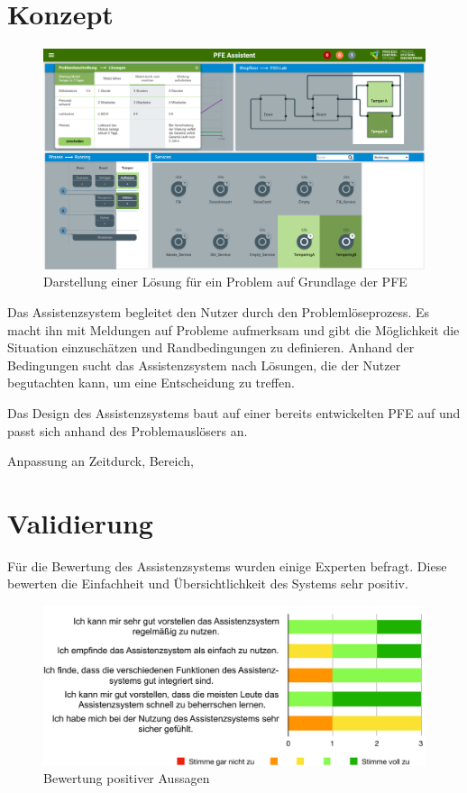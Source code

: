 \documentclass{ifaPoster}
\begin{document}
\section{Konzept}
\begin{figure}[htbp]
\centering
\includegraphics[scale=0.4]{DA_files/Prototyp-PFE-Loesung2.png}
\caption{Darstellung einer Lösung für ein Problem auf Grundlage der PFE}
\end{figure}
Das Assistenzsystem begleitet den Nutzer durch den Problemlöseprozess. Es macht ihn mit Meldungen auf Probleme aufmerksam und gibt die Möglichkeit die Situation einzuschätzen und Randbedingungen zu definieren. Anhand der Bedingungen sucht das Assistenzsystem nach Lösungen, die der Nutzer begutachten kann, um eine Entscheidung zu treffen.

Das Design des Assistenzsystems baut auf einer bereits entwickelten PFE auf \cite{} und passt sich anhand des Problemauslösers an.

Anpassung an Zeitdurck, Bereich, 

\section{Validierung}
Für die Bewertung des Assistenzsystems wurden einige Experten befragt. Diese bewerten die Einfachheit und Übersichtlichkeit des Systems sehr positiv. 

\begin{figure}[htb]
\centering
\includegraphics[scale=0.8]{DA_files/SUS-positiv.pdf}
\caption{Bewertung positiver Aussagen}
\end{figure}
\end{document}
